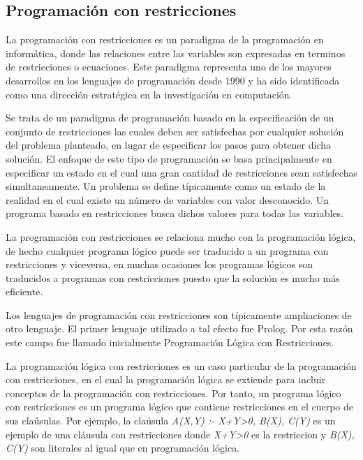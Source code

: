 \subsection{Programaci\'on con restricciones}
\label{ap1:sec:CP}

La programaci\'on con restricciones es un paradigma de la programaci\'on en inform\'atica, donde las relaciones entre las variables son expresadas en terminos de restricciones o ecuaciones. Este paradigma representa uno de los mayores desarrollos en los lenguajes de programaci\'on desde 1990 y ha sido identificada como una direcci\'on estrat\'egica en la investigaci\'on en computaci\'on.

Se trata de un paradigma de programaci\'on basado en la especificaci\'on de un conjunto de restricciones las cuales deben ser satisfechas por cualquier soluci\'on del problema planteado, en lugar de especificar los pasos para obtener dicha soluci\'on. El enfoque de este tipo de programaci\'on se basa principalmente en especificar un estado en el cual una gran cantidad de restricciones sean satisfechas simultaneamente. Un problema se define t\'ipicamente como un estado de la realidad	en el cual existe un n\'umero de variables con valor desconocido. Un programa basado en restricciones busca dichos valores para todas las variables.

La programaci\'on con restricciones se relaciona mucho con la programaci\'on l\'ogica, de hecho cualquier programa l\'ogico puede ser traducido a un programa con restricciones y viceversa, en muchas ocasiones los programas l\'ogicos son traducidos a programas con restricciones puesto que la soluci\'on es mucho m\'as eficiente. 

Los lenguajes de programaci\'on con restricciones son t\'ipicamente ampliaciones de otro lenguaje. El primer lenguaje utilizado a tal efecto fue Prolog. Por esta raz\'on este campo fue llamado inicialmente Programaci\'on L\'ogica con Restricciones.

La programaci\'on l\'ogica con restricciones es un caso particular de la programaci\'on con restricciones, en el cual la programaci\'on l\'ogica se extiende para incluir conceptos de la programaci\'on con restricciones. Por tanto, un programa l\'ogico con restricciones es un programa l\'ogico que contiene restricciones en el cuerpo de sus cla\'usulas. Por ejemplo, la cla\'usula {\it A(X,Y) :- X+Y>0, B(X), C(Y)} es un ejemplo de una cl\'ausula con restricciones donde {\it X+Y>0} es la restriccion y {\it B(X), C(Y)} son literales al igual que en programaci\'on l\'ogica.

